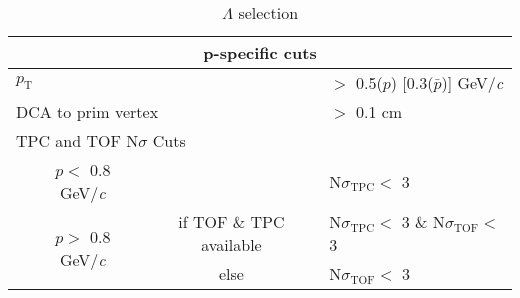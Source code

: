 \documentclass[ALICE,manyauthors]{cernphprep}
\newcommand{\Lam}{$\Lambda$\xspace}
\begin{document}
\begin{table}[htbp]
\begin{tabular}{lc|c|l}
   
   \multicolumn{4}{c}{\textbf{p-specific cuts}} \\
   \hline
   \multicolumn{3}{l|}{$p_{\mathrm{T}}$} & $ > $ 0.5($p$) [0.3($\bar{p}$)] GeV/\textit{c} \\
   \hline
   \multicolumn{3}{l|}{DCA to prim vertex} & $>$ 0.1 cm \\
   \hline
   \multicolumn{4}{l}{TPC and TOF N$\sigma$ Cuts} \\
   \hline
    & \multicolumn{1}{c}{$p <$ 0.8 GeV/\textit{c}} & & N$\sigma_{\mathrm{TPC}} <$ 3 \\
   \hline
    & \multirow{2}{*}{$p >$ 0.8 GeV/\textit{c}} &  if TOF \& TPC available & N$\sigma_{\mathrm{TPC}} <$ 3 \& N$\sigma_{\mathrm{TOF}} <$ 3 \\
   \cline{3-4}
    & & else & N$\sigma_{\mathrm{TOF}} <$ 3 \\
   \hline   
  \end{tabular}
 \caption{\Lam selection}
 \label{tab:LamCuts} 
\end{table}
\end{document}
